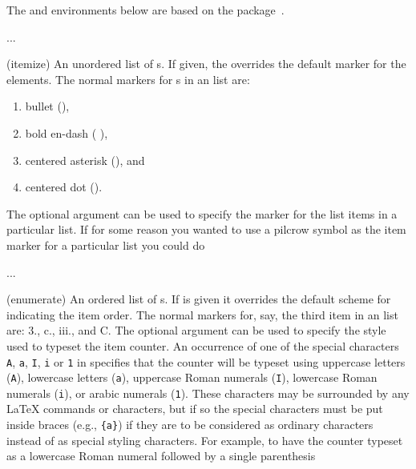     The  and  environments below are based on
the  package~\cite{ENUMERATE}.

\begin{syntax}
 \cmd{\item} ...  \\
\end{syntax}
\glossary(itemize)%
  {}%
  {An unordered list of s. If given, the  overrides the
   default marker for the elements.}
The normal markers for \cmd{\item}s in an  list are: 
\begin{enumerate}
\item bullet (\textbullet \cmd{\textbullet}), 
\item bold en-dash ({\normalfont\bfseries \textendash} \cmd{\bfseries}\cmd{\textendash}),
\item centered asterisk (\textasteriskcentered \cmd{\textasteriskcentered}), and
\item centered dot (\textperiodcentered \cmd{\textperiodcentered}).
\end{enumerate}
The optional  argument can be used to specify the marker for the
list items in a particular list. If for some reason you wanted to use a 
pilcrow symbol as the item marker for a particular list 
you could do



\begin{syntax}
 \cmd{\item} ...  \\
\end{syntax}
\glossary(enumerate)%
  {}%
  {An ordered list of s. If  is given it overrides the
   default scheme for indicating the item order.}
The normal markers for, say, the third item in an  list are: 
3., c., iii., and C. The optional  argument can be used to
specify the style used to typeset the item counter. An occurrence of
one of the special characters \texttt{A}, \texttt{a}, \texttt{I}, \texttt{i}
or \texttt{1} in  specifies that the counter will be typeset using
uppercase letters (\texttt{A}), lowercase letters (\texttt{a}), 
uppercase Roman numerals (\texttt{I}), lowercase Roman numerals (\texttt{i}), 
or arabic numerals (\texttt{1}). These characters
may be surrounded by any LaTeX commands or characters, but if so the special
characters must be put inside braces (e.g., \verb?{a}?) if they are to be 
considered as ordinary characters instead of as special styling characters.
 For example, to have the
counter typeset as a lowercase Roman numeral followed by a single parenthesis


